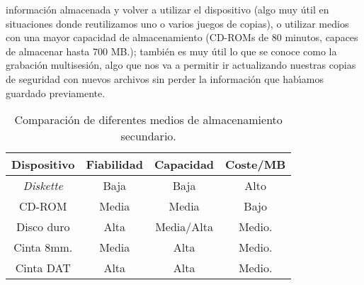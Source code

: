 informaci\'on almacenada y volver a utilizar el dispositivo (algo muy \'util en 
situaciones donde reutilizamos uno o varios juegos de copias), o
utilizar medios con una mayor capacidad de almacenamiento (CD-ROMs de 80 
minutos, capaces de almacenar hasta 700 MB.); tambi\'en es muy \'util lo
que se conoce como la grabaci\'on multisesi\'on, algo que nos va a permitir
ir actualizando nuestras copias de seguridad con nuevos archivos sin perder la
informaci\'on que hab\'{\i}amos guardado previamente.
\begin{table}
\begin{center}
\begin{tabular}{|c|c|c|c|}
\hline
Dispositivo & Fiabilidad & Capacidad & Coste/MB\\
\hline\hline
{\it Diskette} & Baja & Baja & Alto\\
\hline
CD-ROM & Media & Media & Bajo\\
\hline
Disco duro & Alta & Media/Alta & Medio.\\
\hline
Cinta 8mm. & Media & Alta & Medio.\\
\hline
Cinta DAT & Alta & Alta & Medio.\\
\hline
\end{tabular}
\caption{Comparaci\'on de diferentes medios de almacenamiento secundario.}
\label{devices}
\end{center}
\end{table}
